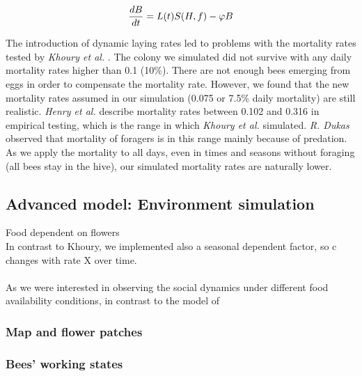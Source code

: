 		\begin{equation}\label{eq:changeBroodNumbersTime}
			{dB \over dt} = L(t)S(H,f)-\phi B
		\end{equation}
		
		The introduction of dynamic laying rates led to problems with the mortality rates tested by \textit{Khoury et al.} \cite{khoury13}. The colony we simulated did not survive with any daily mortality rates higher than 0.1 (10\%). There are not enough bees emerging from eggs in order to compensate the mortality rate. However, we found that the new mortality rates assumed in our simulation (0.075 or 7.5\% daily mortality) are still realistic. \textit{Henry et al.} \cite{henry12} describe mortality rates between 0.102 and 0.316 in empirical testing, which is the range in which \textit{Khoury et al.} \cite{khoury13} simulated. \textit{R. Dukas} \cite{dukas08} observed that mortality of foragers is in this range mainly because of predation. As we apply the mortality to all days, even in times and seasons without foraging (all bees stay in the hive), our simulated mortality rates are naturally lower.
	
	\subsection{Advanced model: Environment simulation}\label{subsec:advancedModel}
		
		Food dependent on flowers\\
		In contrast to Khoury, we implemented also a seasonal dependent factor, so c changes with rate X over time. \\
		\\
		As we were interested in observing the social dynamics under different food availability conditions, in contrast to the model of 
		\subsubsection{Map and flower patches}
		
		\subsubsection{Bees' working states}
			
		
